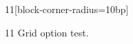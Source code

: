 \documentclass[paper=A4]{ropas-poster}
\begin{document}
\begin{postergrid}{1}{1}[block-corner-radius=10bp]
\begin{posterblock}{1}{1}
Grid option test.
\end{posterblock}
\end{postergrid}
\end{document}
